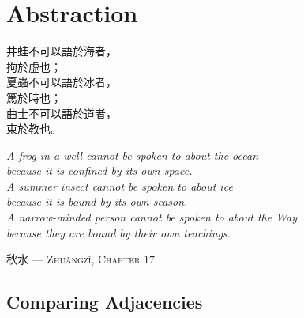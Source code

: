 	{\centering
	\chapter{Abstraction}\label{parte3}}
\thispagestyle{empty}
\noindent
\begin{minipage}[t]{0.35\textwidth}
	\begin{flushright}
		{\large
			\vspace{1pt}
			井蛙不可以語於海者，\\
			拘於虛也；\\[0.5em]
			夏蟲不可以語於冰者，\\
			篤於時也；\\[0.5em]
			曲士不可以語於道者，\\
			束於教也。
		}
	\end{flushright}
\end{minipage}%
\hfill
\vrule
\hfill
\begin{minipage}[t]{0.48\textwidth}
	\vspace{1pt}
	\raggedright
	\emph{
		$\!\!$A frog in a well cannot be spoken to about the ocean\\
		because it is confined by its own space.\\[0.5em]
		A summer insect cannot be spoken to about ice \\
		because it is bound by its own season.\\[0.5em]
		A narrow-minded person cannot be spoken to about the Way \\
		because they are bound by their own teachings.
	}
\end{minipage}

\vspace{1em}
\hfill {   秋水 — \textsc{Zhuāngzǐ, Chapter 17}}

\section{Comparing Adjacencies}\label{chap:6}

